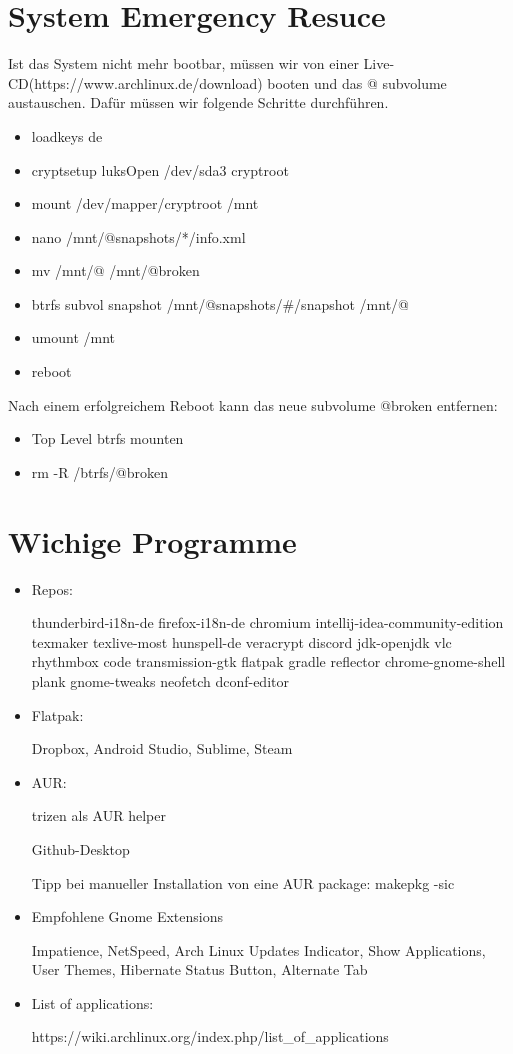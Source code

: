 \documentclass[11pt,a4paper]{article}
\begin{document}
\section{System Emergency Resuce}
Ist das System nicht mehr bootbar, müssen wir von einer Live-CD(https://www.archlinux.de/download) booten und das @ subvolume austauschen.
Dafür müssen wir folgende Schritte durchführen.
\begin{itemize}
\item loadkeys de
\item cryptsetup luksOpen /dev/sda3 	cryptroot
\item mount /dev/mapper/cryptroot /mnt
\item nano /mnt/@snapshots/*/info.xml
\item mv /mnt/@ /mnt/@broken
\item btrfs subvol snapshot /mnt/@snapshots/\#/snapshot /mnt/@
\item umount /mnt
\item reboot
\end{itemize}
Nach einem erfolgreichem Reboot kann das neue subvolume @broken entfernen:
\begin{itemize}
\item Top Level btrfs mounten
\item rm -R /btrfs/@broken
\end{itemize}



\section{Wichige Programme}
\begin{itemize}
\item Repos:

thunderbird-i18n-de firefox-i18n-de chromium intellij-idea-community-edition texmaker texlive-most hunspell-de veracrypt discord jdk-openjdk vlc rhythmbox code transmission-gtk flatpak gradle reflector chrome-gnome-shell plank gnome-tweaks neofetch dconf-editor
\item Flatpak:

Dropbox, Android Studio, Sublime, Steam
\item AUR:

\glqq{}trizen\grqq{} als AUR helper

Github-Desktop

Tipp bei manueller Installation von eine AUR package: makepkg -sic

\item Empfohlene Gnome Extensions

Impatience, NetSpeed, Arch Linux Updates Indicator, Show Applications, User Themes, Hibernate Status Button, Alternate Tab

\item List of applications:

https://wiki.archlinux.org/index.php/list\_of\_applications

\end{itemize}
\end{document}
